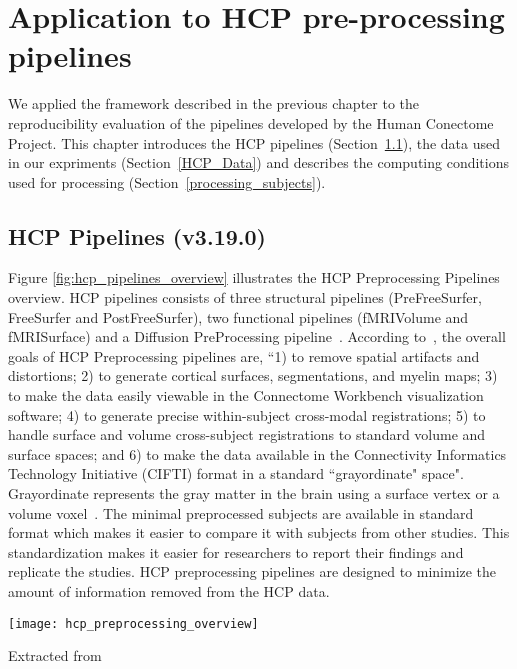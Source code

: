 \chapter{Application to HCP pre-processing pipelines}
\setlength{\parskip}{1em}
\setlength{\parindent}{4em}
We applied the framework described in the previous chapter to the reproducibility evaluation of the pipelines developed by the Human Conectome Project. This chapter introduces the HCP pipelines (Section~\ref{hcp_pipelines}), the data used in our expriments (Section~\ref{HCP_Data}) and describes the computing conditions used for processing (Section~\ref{processing_subjects}).

\section{HCP Pipelines (v3.19.0)} \label{hcp_pipelines}
Figure \ref{fig:hcp_pipelines_overview} illustrates the HCP Preprocessing Pipelines overview. HCP pipelines consists of three structural pipelines (PreFreeSurfer, FreeSurfer and PostFreeSurfer), two functional pipelines (fMRIVolume and fMRISurface) and a Diffusion PreProcessing pipeline~\cite{Gla13}. According to~\cite{Gla13}, the overall goals of HCP Preprocessing pipelines are, ``1) to remove spatial artifacts and distortions; 2) to generate cortical surfaces, segmentations, and myelin maps; 3) to make the data easily viewable in the Connectome Workbench visualization software; 4) to generate precise within-subject cross-modal registrations; 5) to handle surface and volume cross-subject registrations to standard volume and surface spaces; and 6) to make the data available in the Connectivity Informatics Technology Initiative (CIFTI) format in a standard ``grayordinate" space". Grayordinate represents the gray matter in the brain using a surface vertex or a volume voxel~\cite{Grayordinate}. The minimal preprocessed subjects are available in standard format which makes it easier to compare it with subjects from other studies. This standardization makes it easier for researchers to report their findings and replicate the studies. HCP preprocessing pipelines are designed to minimize the amount of information removed from the HCP data.

\begin{center}
   \texttt{[image: hcp\_preprocessing\_overview]}
   \label{fig:hcp_pipelines_overview}
   \caption*{Extracted from \cite{Gla13}}
\end{center}

